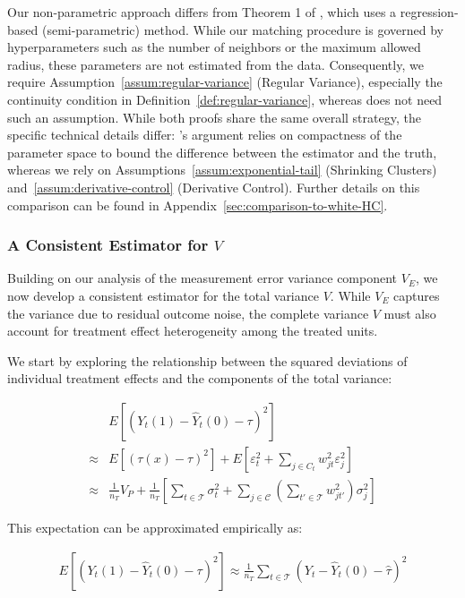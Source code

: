 \documentclass{mytemplate}
\begin{document}
Our non-parametric approach differs from Theorem 1 of \cite{white1980heteroskedasticity}, which uses a regression-based (semi-parametric) method. While our matching procedure is governed by hyperparameters such as the number of neighbors or the maximum allowed radius, these parameters are not estimated from the data. Consequently, we require Assumption~\ref{assum:regular-variance} (Regular Variance), especially the continuity condition in Definition~\ref{def:regular-variance}, whereas \cite{white1980heteroskedasticity} does not need such an assumption. While both proofs share the same overall strategy, the specific technical details differ: \cite{white1980heteroskedasticity}'s argument relies on compactness of the parameter space to bound the difference between the estimator and the truth, whereas we rely on Assumptions~\ref{assum:exponential-tail} (Shrinking Clusters) and~\ref{assum:derivative-control} (Derivative Control). Further details on this comparison can be found in Appendix~\ref{sec:comparison-to-white-HC}.

\subsubsection{A Consistent Estimator for $V$}
Building on our analysis of the measurement error variance component $V_E$, we now develop a consistent estimator for the total variance $V$. While $V_E$ captures the variance due to residual outcome noise, the complete variance $V$ must also account for treatment effect heterogeneity among the treated units.

We start by exploring the relationship between the squared deviations of individual treatment effects and the components of the total variance:

$$
\begin{aligned}
& E\left[\left(Y_t(1)-\hat{Y}_t(0)-\tau\right)^2\right] \\
\approx & E\left[(\tau(x)-\tau)^2\right]+E\left[\varepsilon_t^2+\sum_{j \in C_t} w_{j t}^2 \varepsilon_j^2\right] \\
\approx & \frac{1}{n_T} V_P + \frac{1}{n_T}\left[\sum_{t \in \mathcal{T}} \sigma_t^2+\sum_{j \in \mathcal{C}}\left(\sum_{t' \in \mathcal{T}} w_{j t'}^2\right) \sigma_j^2\right]
\end{aligned}
$$

This expectation can be approximated empirically as:

$$
\begin{aligned}
E\left[\left(Y_t(1)-\hat{Y}_t(0)-\tau\right)^2\right] \approx \frac{1}{n_T} \sum_{t \in \mathcal{T}}\left(Y_t-\hat{Y}_t(0)-\hat{\tau}\right)^2
\end{aligned}
$$
\end{document}
